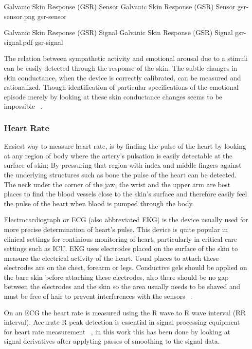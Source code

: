 \img
{Galvanic Skin Response (GSR) Sensor}
{Galvanic Skin Response (GSR) Sensor}
{gsr-sensor.png}
{gsr-sensor}

\img
{Galvanic Skin Response (GSR) Signal}
{Galvanic Skin Response (GSR) Signal}
{gsr-signal.pdf}
{gsr-signal}

The relation between sympathetic activity and emotional arousal due to a stimuli can be easily detected through the response of the skin. The subtle changes in skin conductance, when the device is correctly calibrated, can be measured and rationalized. Though identification of particular specifications of the emotional episode merely by looking at these skin conductance changes seems to be impossible ~\cite{pflanzer2013galvanic}.

\subsubsection{Heart Rate}
Easiest way to measure heart rate, is by finding the pulse of the heart by looking at any region of body where the artery's pulsation is easily detectable at the surface of skin; By pressuring that region with index and middle fingers against the underlying structures such as bone the pulse of the heart can be detected. The neck under the corner of the jaw, the wrist and the upper arm are best places to find the blood vessels close to the skin's surface and therefore easily feel the pulse of the heart when blood is pumped through the body.

Electrocardiograph or ECG (also abbreviated EKG) is the device usually used for more precise determination of heart's pulse. This device is quite popular in clinical settings for continious monitoring of heart, particularly in critical care settings such as ICU. EKG uses electrodes placed on the surface of the skin to measure the electrical activity of the heart. Usual places to attach these electrodes are on the chest, forearm or legs. Conductive gels should be applied on the bare skin before attaching these electrodes, also there should be no gap between the electrodes and the skin so the area usually needs to be shaved and must be free of hair to prevent interferences with the sensors ~\cite{stern2001psychophysiological}.

On an ECG the heart rate is measured using the R wave to R wave interval (RR interval). Accurate R peak detection is essential in signal processing equipment for heart rate measurement ~\cite{pise2011thinkquest}, in this work this has been done by looking at signal derivatives after applyting passes of smoothing to the signal data.

